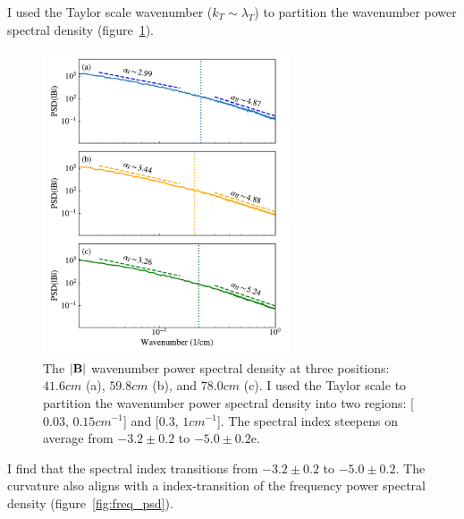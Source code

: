 \documentclass[%
 aip,
 amsmath,amssymb,
preprint,%
]{revtex4-1}
\begin{document}
I used the Taylor scale wavenumber ($k_T\sim\lambda_{T}$) to partition the wavenumber power spectral density (figure~\ref{fig:wave_psd}).
\begin{figure}
\includegraphics[width=0.65\textwidth]{Figures/psd/pwr_den_k_interpv2.pdf}%
\caption{\label{fig:wave_psd} The $|\vb{B}|$ wavenumber power spectral density at three positions: $41.6cm$ (a), $59.8cm$ (b), and $78.0cm$ (c). I used the Taylor scale to partition the wavenumber power spectral density into two regions: [$0.03$, $0.15 cm^{-1}$] and [$0.3$, $1 cm^{-1}$]. The spectral index steepens on average from $-3.2\pm0.2$ to $-5.0\pm0.2$e.}
\end{figure}
I find that the spectral index transitions from $-3.2\pm0.2$ to $-5.0\pm0.2$. The curvature also aligns with a index-transition of the frequency power spectral density (figure~\ref{fig:freq_psd}).
\end{document}
